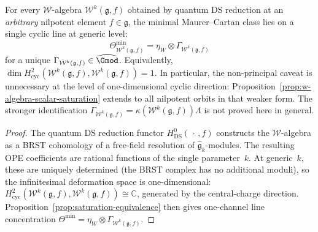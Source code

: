 \begin{proposition}
\label{prop:nonprincipal-scalar-saturation}
For every $\mathcal{W}$-algebra $\mathcal{W}^k(\mathfrak{g}, f)$
obtained by quantum DS reduction at an \emph{arbitrary} nilpotent
element $f \in \mathfrak{g}$, the minimal Maurer--Cartan class lies on
a single cyclic line at generic level:
\[
\Theta_{\mathcal{W}^k(\mathfrak{g}, f)}^{\min}
= \eta_W \otimes \Gamma_{\mathcal{W}^k(\mathfrak{g}, f)}
\]
for a unique
$\Gamma_{\mathcal{W}^k(\mathfrak{g}, f)} \in \widehat{\Gmod}$.
Equivalently,
$\dim H^2_{\mathrm{cyc}}(\mathcal{W}^k(\mathfrak{g}, f),
\mathcal{W}^k(\mathfrak{g}, f)) = 1$.
In particular, the non-principal caveat is unnecessary at the
level of one-dimensional cyclic direction:
Proposition~\textup{\ref{prop:w-algebra-scalar-saturation}}
extends to all nilpotent orbits in that weaker form.
The stronger identification
$\Gamma_{\mathcal{W}^k(\mathfrak{g}, f)}
= \kappa(\mathcal{W}^k(\mathfrak{g}, f))\Lambda$
is not proved here in general.
\end{proposition}

\begin{proof}
The quantum DS reduction functor
$H^0_{\mathrm{DS}}(\,\cdot\,, f)$ constructs the
$\mathcal{W}$-algebra as a BRST cohomology of a free-field
resolution of $\widehat{\mathfrak{g}}_k$-modules.  The resulting
OPE coefficients are rational functions of the single
parameter~$k$.  At generic~$k$, these are uniquely determined
(the BRST complex has no additional moduli), so the infinitesimal
deformation space is one-dimensional:
$H^2_{\mathrm{cyc}}(\mathcal{W}^k(\mathfrak{g},f),
\mathcal{W}^k(\mathfrak{g},f)) \cong \mathbb{C}$,
generated by the central-charge direction.
Proposition~\ref{prop:saturation-equivalence}
then gives one-channel line concentration
$\Theta^{\min} = \eta_W \otimes
\Gamma_{\mathcal{W}^k(\mathfrak{g}, f)}$.
\end{proof}

